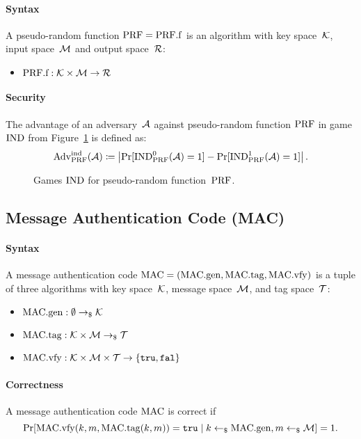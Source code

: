 \documentclass[a4paper,orivec]{llncs}
\begin{document}
\paragraph{Syntax}
A pseudo-random function $\mathrm{PRF}=\mathrm{PRF}.\mathrm{f}$ is an algorithm with key space~$\mathcal{K}$, input space~$\mathcal{M}$ and output space~$\mathcal{R}$:

\begin{itemize}
    \item $\mathrm{PRF}.\mathrm{f}: \mathcal{K}\times\mathcal{M} \to \mathcal{R}$
\end{itemize}

\paragraph{Security}
The advantage of an adversary~$\mathcal{A}$ against pseudo-random function $\mathrm{PRF}$ in game ${\mathrm{IND}}$ from Figure~\ref{fig:prf:ind} is defined as:
\[
\mathrm{Adv}_{\mathrm{PRF}}^{\mathrm{ind}}(\mathcal{A})\coloneqq\left|\Pr[{\mathrm{IND}}_{\mathrm{PRF}}^0(\mathcal{A})=1]-\Pr[{\mathrm{IND}}_{\mathrm{PRF}}^1(\mathcal{A})=1]\right|\text{.}
\]

\begin{figure}[!ht]
    \centering
    \nicoresetlinenr%
    \fbox{%
        \scalebox{\codescalefactor}{%
        }%
    }
    \caption{%
        Games ${\mathrm{IND}}$ for pseudo-random function~$\mathrm{PRF}$.
    }
    \label{fig:prf:ind}
\end{figure}

\subsection{Message Authentication Code (MAC)}

\paragraph{Syntax}
A message authentication code $\mathrm{MAC}=(\mathrm{MAC}.\mathrm{gen},\mathrm{MAC}.\mathrm{tag},\mathrm{MAC}.\mathrm{vfy})$ is a tuple of three algorithms with key space~$\mathcal{K}$, message space~$\mathcal{M}$, and tag space~$\mathcal{T}$:

\begin{itemize}
    \item $\mathrm{MAC}.\mathrm{gen}: \emptyset \to_\$ \mathcal{K}$
    \item $\mathrm{MAC}.\mathrm{tag}: \mathcal{K}\times\mathcal{M} \to_\$ \mathcal{T}$
    \item $\mathrm{MAC}.\mathrm{vfy}: \mathcal{K}\times\mathcal{M}\times\mathcal{T} \to \{\mathtt{tru},\mathtt{fal}\}$
\end{itemize}

\paragraph{Correctness}
A message authentication code $\mathrm{MAC}$ is correct if
\[
\Pr[\mathrm{MAC}.\mathrm{vfy}(k,m,\mathrm{MAC}.\mathrm{tag}(k,m))=\mathtt{tru}\mid k\gets_\$\mathrm{MAC}.\mathrm{gen},m\gets_\$\mathcal{M}]=1\text{.}
\]
\end{document}
